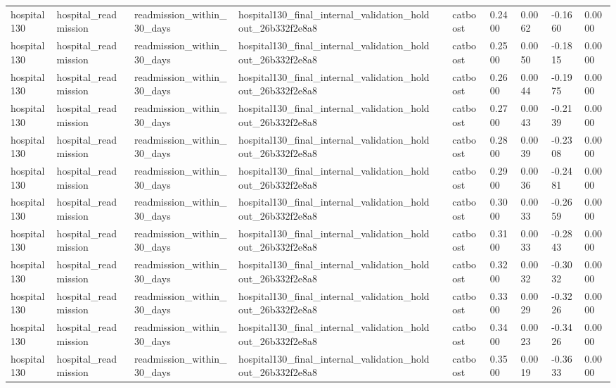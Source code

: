 \begin{tabular}{llllllllll}
hospital130 & hospital\_readmission & readmission\_within\_30\_days & hospital130\_final\_internal\_validation\_holdout\_26b332f2e8a8 &  & catboost & 0.2400 & 0.0062 & -0.1660 & 0.0000 \\
hospital130 & hospital\_readmission & readmission\_within\_30\_days & hospital130\_final\_internal\_validation\_holdout\_26b332f2e8a8 &  & catboost & 0.2500 & 0.0050 & -0.1815 & 0.0000 \\
hospital130 & hospital\_readmission & readmission\_within\_30\_days & hospital130\_final\_internal\_validation\_holdout\_26b332f2e8a8 &  & catboost & 0.2600 & 0.0044 & -0.1975 & 0.0000 \\
hospital130 & hospital\_readmission & readmission\_within\_30\_days & hospital130\_final\_internal\_validation\_holdout\_26b332f2e8a8 &  & catboost & 0.2700 & 0.0043 & -0.2139 & 0.0000 \\
hospital130 & hospital\_readmission & readmission\_within\_30\_days & hospital130\_final\_internal\_validation\_holdout\_26b332f2e8a8 &  & catboost & 0.2800 & 0.0039 & -0.2308 & 0.0000 \\
hospital130 & hospital\_readmission & readmission\_within\_30\_days & hospital130\_final\_internal\_validation\_holdout\_26b332f2e8a8 &  & catboost & 0.2900 & 0.0036 & -0.2481 & 0.0000 \\
hospital130 & hospital\_readmission & readmission\_within\_30\_days & hospital130\_final\_internal\_validation\_holdout\_26b332f2e8a8 &  & catboost & 0.3000 & 0.0033 & -0.2659 & 0.0000 \\
hospital130 & hospital\_readmission & readmission\_within\_30\_days & hospital130\_final\_internal\_validation\_holdout\_26b332f2e8a8 &  & catboost & 0.3100 & 0.0033 & -0.2843 & 0.0000 \\
hospital130 & hospital\_readmission & readmission\_within\_30\_days & hospital130\_final\_internal\_validation\_holdout\_26b332f2e8a8 &  & catboost & 0.3200 & 0.0032 & -0.3032 & 0.0000 \\
hospital130 & hospital\_readmission & readmission\_within\_30\_days & hospital130\_final\_internal\_validation\_holdout\_26b332f2e8a8 &  & catboost & 0.3300 & 0.0029 & -0.3226 & 0.0000 \\
hospital130 & hospital\_readmission & readmission\_within\_30\_days & hospital130\_final\_internal\_validation\_holdout\_26b332f2e8a8 &  & catboost & 0.3400 & 0.0023 & -0.3426 & 0.0000 \\
hospital130 & hospital\_readmission & readmission\_within\_30\_days & hospital130\_final\_internal\_validation\_holdout\_26b332f2e8a8 &  & catboost & 0.3500 & 0.0019 & -0.3633 & 0.0000 \\

\end{tabular}
